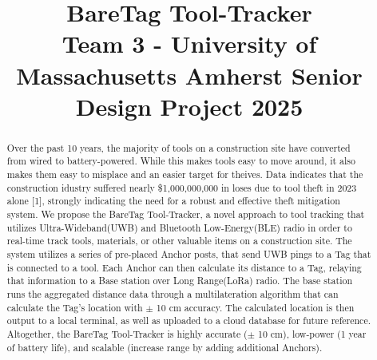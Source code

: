 \documentclass[conference]{IEEEtran}
\begin{document}
\title{BareTag Tool-Tracker\\
{\footnotesize {Team 3 - University of Massachusetts Amherst Senior Design Project 2025 }}
}

\author{
    \and
    \and
    \and
    \and
}

\maketitle

\begin{abstract}
    Over the past 10 years, the majority of tools on a construction 
    site have converted from wired to battery-powered. While this 
    makes tools easy to move around, it also makes them easy to misplace
    and an easier target for theives. Data indicates that the construction
    idustry suffered nearly \$1,000,000,000 in loses due to tool theft in
    2023 alone [1], strongly indicating the need for a robust and effective 
    theft mitigation system. We propose the BareTag Tool-Tracker, a novel
    approach to tool tracking that utilizes Ultra-Wideband(UWB) and Bluetooth 
    Low-Energy(BLE) radio in order to real-time track tools, materials, or other 
    valuable items on a construction site. The system utilizes a series
    of pre-placed Anchor posts, that send UWB pings to a Tag that is connected
    to a tool. Each Anchor can then calculate its distance to a Tag, relaying
    that information to a Base station over Long Range(LoRa) radio. The 
    base station runs the aggregated distance data through a multilateration
    algorithm that can calculate the Tag's location with $\pm$ 10 cm accuracy.
    The calculated location is then output to a local terminal, as well as 
    uploaded to a cloud database for future reference. Altogether, the BareTag Tool-Tracker
    is highly accurate ($\pm$ 10 cm), low-power (1 year of battery life), and
    scalable (increase range by adding additional Anchors).
\end{abstract}
\end{document}
